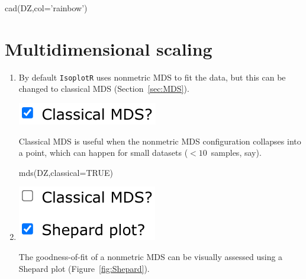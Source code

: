 \begin{refsection}
\begin{console}
cad(DZ,col='rainbow')
\end{console}

\section{Multidimensional scaling}

\begin{enumerate}

\item By default \texttt{IsoplotR} uses nonmetric MDS to fit the data,
  but this can be changed to classical MDS (Section~\ref{sec:MDS}).
  
  \noindent\begin{minipage}[t]{.18\linewidth}
\strut\vspace*{-\baselineskip}\newline
\includegraphics[width=\linewidth]{../figures/detritalMDSclassical.png}
\end{minipage}
\begin{minipage}[t]{.82\linewidth}
Classical MDS is useful when the nonmetric MDS configuration collapses
into a point, which can happen for small datasets ($< 10$~samples,
say).
\end{minipage}

\begin{console}
mds(DZ,classical=TRUE)
\end{console}

\item\noindent\begin{minipage}[t]{.18\linewidth}
\strut\vspace*{-\baselineskip}\newline
\includegraphics[width=\linewidth]{../figures/detritalMDSshepard.png}
\end{minipage}
\begin{minipage}[t]{.82\linewidth}
The goodness-of-fit of a nonmetric MDS can be visually assessed using
a Shepard plot (Figure~\ref{fig:Shepard}).
\end{minipage}


\end{enumerate}
\end{refsection}

